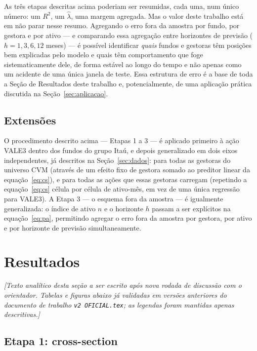 \documentclass[11pt,a4paper]{article}
\begin{document}
As três etapas descritas acima poderiam ser resumidas, cada uma, num único número: um
$R^2$, um $\widehat\lambda$, uma margem agregada. Mas o valor deste trabalho está em não parar
nesse resumo. Agregando o erro fora da amostra por fundo, por gestora e por ativo --- e
comparando essa agregação entre horizontes de previsão ($h=1,3,6,12$ meses) --- é possível
identificar \emph{quais} fundos e gestoras têm posições bem explicadas pelo modelo e quais têm
comportamento que foge sistematicamente dele, de forma estável ao longo do tempo e não apenas
como um acidente de uma única janela de teste. Essa estrutura de erro é a base de toda a Seção
de Resultados deste trabalho e, potencialmente, de uma aplicação prática discutida na
Seção~\ref{sec:aplicacao}.

\FloatBarrier
\subsection{Extensões}

O procedimento descrito acima --- Etapas 1 a 3 --- é aplicado primeiro à ação VALE3 dentro dos
fundos do grupo Itaú, e depois generalizado em dois eixos independentes, já descritos na
Seção~\ref{sec:dados}: para todas as gestoras do universo CVM (através de um efeito fixo de
gestora somado ao preditor linear da equação~\eqref{eq:cs}), e para todas as ações que essas
gestoras carregam (repetindo a equação~\eqref{eq:cs} célula por célula de ativo-mês, em vez de
uma única regressão para VALE3). A Etapa 3 --- o esquema fora da amostra --- é igualmente
generalizada: o índice de ativo $n$ e o horizonte $h$ passam a ser explícitos na
equação~\eqref{eq:pa}, permitindo agregar o erro fora da amostra por gestora, por ativo e por
horizonte de previsão simultaneamente.

\section{Resultados}
\label{sec:resultados}

\emph{[Texto analítico desta seção a ser escrito após nova rodada de discussão com o
orientador. Tabelas e figuras abaixo já validadas em versões anteriores do documento de
trabalho \texttt{v2 OFICIAL.tex}; as legendas foram mantidas apenas descritivas.]}

\FloatBarrier
\subsection{Etapa 1: cross-section}
\end{document}
